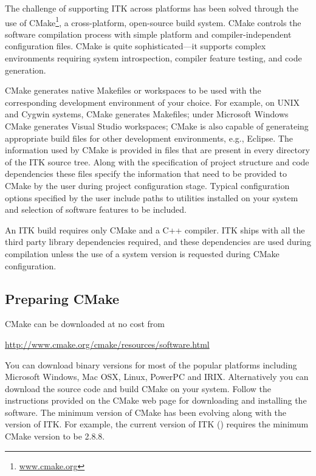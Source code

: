 The challenge of supporting ITK across platforms has been solved through the
use of CMake\footnote{\url{www.cmake.org}}, a cross-platform, open-source build
system. CMake controls the software compilation process with simple platform
and compiler-independent configuration files. CMake is quite sophisticated---it
supports complex environments requiring system introspection, compiler feature
testing, and code generation.

CMake generates native Makefiles or workspaces to be used with the corresponding
development environment of your choice. For example, on UNIX and Cygwin systems,
CMake generates Makefiles; under Microsoft Windows CMake generates Visual Studio
workspaces; CMake is also capable of generateing appropriate build files for
other development environments, e.g., Eclipse. The information used by CMake is
provided in  files that are present in every directory of
the ITK source tree. Along with the specification of project structure and code
dependencies these files specify the information that need to be provided to
CMake by the user during project configuration stage. Typical configuration
options specified by the user include paths to utilities installed on your
system and selection of software features to be included.

An ITK build requires only CMake and a C++ compiler. ITK ships with all the
third party library dependencies required, and these dependencies are used
during compilation unless the use of a system version is requested during CMake
configuration.

\subsection{Preparing CMake}
\label{sec:CMakeforITK}


CMake can be downloaded at no cost from
\begin{center}
  \url{http://www.cmake.org/cmake/resources/software.html}
\end{center}

You can download binary versions for most of the popular platforms including
Microsoft Windows, Mac OSX, Linux, PowerPC and IRIX. Alternatively you can
download the source code and build CMake on your system. Follow the instructions
provided on the CMake web page for downloading and installing the software. The
minimum version of CMake has been evolving along with the version of ITK. For
example, the current version of ITK (\ITKVERSIONMAJORMINOR) requires the minimum
CMake version to be 2.8.8.

